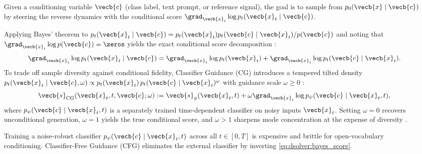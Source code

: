 \documentclass[../../../../master.tex]{subfiles}
\begin{document}
Given a conditioning variable $\vecb{c}$ (class label, text prompt, or reference signal), the goal is to sample from $p_0(\vecb{x}\mid\vecb{c})$ by steering the reverse dynamics with the conditional score $\grad_{\vecb{x}_t}\log p_t(\vecb{x}_t\mid\vecb{c})$.

\begin{coremath}
Applying Bayes' theorem to $p_t(\vecb{x}_t \mid \vecb{c}) = p_t(\vecb{x}_t) p_t(\vecb{c}\mid\vecb{x}_t) / p(\vecb{c})$ and noting that $\grad_{\vecb{x}_t}\log p(\vecb{c}) = \zeros$ yields the exact conditional score decomposition :
\begin{equation}
  \label{eq:dsolver:bayes_score}
  \grad_{\vecb{x}_t} \log p_t(\vecb{x}_t \mid \vecb{c}) = \grad_{\vecb{x}_t} \log p_t(\vecb{x}_t) + \grad_{\vecb{x}_t} \log p_t(\vecb{c} \mid \vecb{x}_t).
\end{equation}
To trade off sample diversity against conditional fidelity, Classifier Guidance (CG) introduces a tempered tilted density $p_t(\vecb{x}_t \mid \vecb{c}, \omega) \propto p_t(\vecb{x}_t)\, p_t(\vecb{c}\mid\vecb{x}_t)^{\omega}$ with guidance scale $\omega \ge 0$ :
\begin{equation}
  \label{eq:dsolver:cg_score}
  \vecb{s}_{\mathrm{CG}}(\vecb{x}_t, t, \vecb{c}; \omega)
  := \vecb{s}_\phi(\vecb{x}_t, t) + \omega \grad_{\vecb{x}_t} \log p_\psi(\vecb{c} \mid \vecb{x}_t, t),
\end{equation}
where $p_\psi(\vecb{c}\mid\vecb{x}_t, t)$ is a separately trained time-dependent classifier on noisy inputs $\vecb{x}_t$. Setting $\omega = 0$ recovers unconditional generation, $\omega = 1$ yields the true conditional score, and $\omega > 1$ sharpens mode concentration at the expense of diversity .
\end{coremath}

Training a noise-robust classifier $p_\psi(\vecb{c}\mid\vecb{x}_t, t)$ across all $t \in [0, T]$ is expensive and brittle for open-vocabulary conditioning. Classifier-Free Guidance (CFG) eliminates the external classifier by inverting \eqref{eq:dsolver:bayes_score}.
\end{document}
